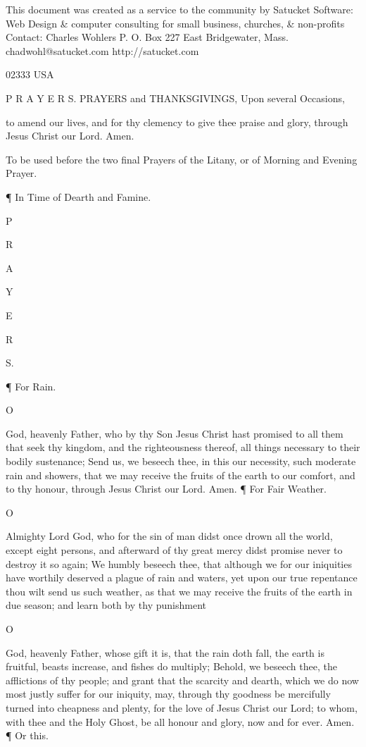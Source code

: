 This document was created as a service to the community by Satucket Software: Web Design \& computer consulting for small business, churches, \& non-profits Contact: Charles Wohlers P. O. Box 227 East Bridgewater, Mass. chadwohl@satucket.com http://satucket.com

02333 USA

P R A Y E R S. PRAYERS and THANKSGIVINGS, Upon several Occasions,

to amend our lives, and for thy clemency to give thee praise and glory, through Jesus Christ our Lord. Amen.

To be used before the two final Prayers of the Litany, or of Morning and Evening Prayer.

¶ In Time of Dearth and Famine.

P

R

A

Y

E

R

S.

¶ For Rain.

O

God, heavenly Father, who by thy Son Jesus Christ hast promised to all them that seek thy kingdom, and the righteousness thereof, all things necessary to their bodily sustenance; Send us, we beseech thee, in this our necessity, such moderate rain and showers, that we may receive the fruits of the earth to our comfort, and to thy honour, through Jesus Christ our Lord. Amen. ¶ For Fair Weather.

O

Almighty Lord God, who for the sin of man didst once drown all the world, except eight persons, and afterward of thy great mercy didst promise never to destroy it so again; We humbly beseech thee, that although we for our iniquities have worthily deserved a plague of rain and waters, yet upon our true repentance thou wilt send us such weather, as that we may receive the fruits of the earth in due season; and learn both by thy punishment

O

God, heavenly Father, whose gift it is, that the rain doth fall, the earth is fruitful, beasts increase, and fishes do multiply; Behold, we beseech thee, the afflictions of thy people; and grant that the scarcity and dearth, which we do now most justly suffer for our iniquity, may, through thy goodness be mercifully turned into cheapness and plenty, for the love of Jesus Christ our Lord; to whom, with thee and the Holy Ghost, be all honour and glory, now and for ever. Amen. ¶ Or this.

